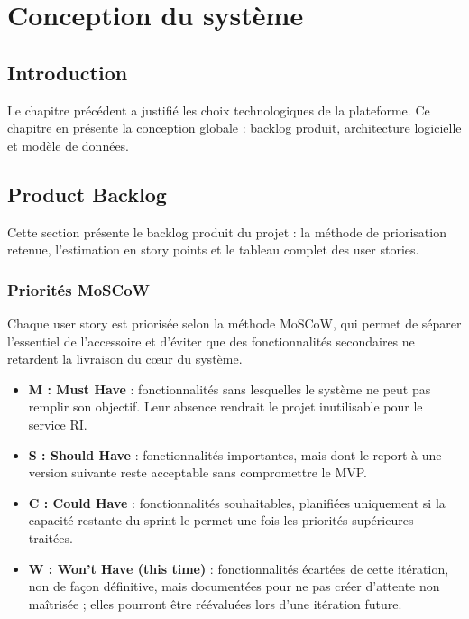 ﻿%
\chapter{Conception du système}
\label{cha:conception}
\begingroup
\let\clearpage\relax
\startcontents[chapters]
\endgroup
\newpage

\section*{Introduction}
\justifying
{}
{}

Le chapitre précédent a justifié les choix technologiques de la plateforme. Ce chapitre en présente la conception globale : backlog produit, architecture logicielle et modèle de données.

\section{Product Backlog}

Cette section présente le backlog produit du projet : la méthode de priorisation retenue, l'estimation en story points et le tableau complet des user stories.

\subsection{Priorités MoSCoW}

Chaque user story est priorisée selon la méthode MoSCoW, qui permet de séparer l'essentiel de l'accessoire et d'éviter que des fonctionnalités secondaires ne retardent la livraison du cœur du système.

\begin{itemize}[label=•]
    \item \textbf{M : Must Have} : fonctionnalités sans lesquelles le système ne peut pas remplir son objectif. Leur absence rendrait le projet inutilisable pour le service RI.
    \item \textbf{S : Should Have} : fonctionnalités importantes, mais dont le report à une version suivante reste acceptable sans compromettre le MVP.
    \item \textbf{C : Could Have} : fonctionnalités souhaitables, planifiées uniquement si la capacité restante du sprint le permet une fois les priorités supérieures traitées.
    \item \textbf{W : Won't Have (this time)} : fonctionnalités écartées de cette itération, non de façon définitive, mais documentées pour ne pas créer d'attente non maîtrisée ; elles pourront être réévaluées lors d'une itération future.
\end{itemize}

